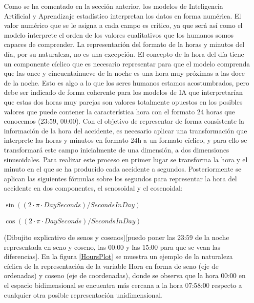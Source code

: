 \documentclass{uathesis-es}
\begin{document}
Como se ha comentado en la sección anterior, los modelos de Inteligencia Artificial y Aprendizaje estadístico interpretan los datos en forma numérica. El valor numérico que se le asigna a cada campo es crítico, ya que será así como el modelo interprete el orden de los valores cualitativos que los humanos somos capaces de comprender. La representación del formato de la horas y minutos del día, por su naturaleza, no es una excepción. El concepto de la hora del día tiene un componente cíclico que es necesario representar para que el modelo comprenda que las once y cincuentainueve de la noche es una hora muy próximas a las doce de la noche. Esto es algo a lo que los seres humanos estamos acostumbrados, pero debe ser indicado de forma coherente para los modelos de IA que interpretarían que estas dos horas muy parejas son valores totalmente opuestos en los posibles valores que puede contener la característica hora con el formato 24 horas que conocemos (23:59, 00:00). Con el objetivo de representar de forma consistente la información de la hora del accidente, es necesario aplicar una transformación que interprete las horas y minutos en formato 24h a un formato cíclico, y para ello se transformará este campo inicialmente de una dimensión, a dos dimensiones sinusoidales. Para realizar este proceso en primer lugar se transforma la hora y el minuto en el que se ha producido cada accidente a segundos. Posteriormente se aplican las siguientes fórmulas sobre los segundos para representar la hora del accidente en dos componentes, el senosoidal y el cosenoidal:


\begin{center}
    $\sin((2 \cdot \pi \cdot DaySeconds)/SecondsInDay)$
    
    $\cos((2 \cdot \pi \cdot DaySeconds)/SecondsInDay)$
\end{center}

(Dibujito explicativo de senos y cosenos)[puedo poner las 23:59 de la noche representada en seno y coseno, las 00:00 y las 15:00 para que se vean las diferencias]. En la figura \ref{HoursPlot} se muestra un ejemplo de la naturaleza cíclica de la representación de la variable Hora en forma de seno (eje de ordenadas) y coseno (eje de coordenadas), donde se observa que la hora 00:00 en el espacio bidimensional se encuentra más cercana a la hora 07:58:00 respecto a cualquier otra posible representación unidimensional.
\end{document}
